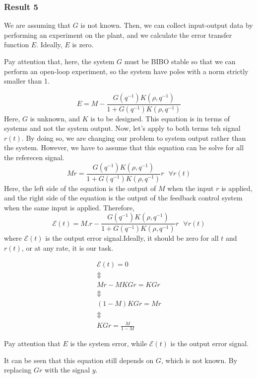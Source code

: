 \subsubsection{Result 5}
We are assuming that $G$ is not known. Then, we can collect input-output data by performing an experiment on the plant, and we calculate the error transfer function $E$. Ideally, $E$ is zero.

\begin{factbox}
Pay attention that, here, the system $G$ must be BIBO stable so that we can perform an open-loop experiment, so the system have poles with a norm strictly smaller than 1. 
\end{factbox}

\[
E = M - \frac{G(q^{-1}) K(\rho,q^{-1})}{1+G(q^{-1}) K(\rho,q^{-1})}
\]
Here, $G$ is unknown, and $K$ is to be designed. This equation is in terms of systems and not the system output. Now, let's apply to both terms teh signal $r(t)$. By doing so, we are changing our problem to system output rather than the system. However, we have to assume that this equation can be solve for all the referecen signal.
\[
Mr =  \frac{G(q^{-1}) K(\rho,q^{-1})}{1+G(q^{-1}) K(\rho,q^{-1})}r \:\:\: \forall r(t)
\]
Here, the left side of the equation is the output of $M$ when the input $r$ is applied, and the right side of the equation is the output of the feedback control system when the same input is applied. Therefore,
\[
\mathcal{E}(t) = M.r - \frac{G(q^{-1}) K(\rho,q^{-1})}{1+G(q^{-1}) K(\rho,q^{-1})}r \:\:\: \forall r(t)
\]
where $\mathcal{E}(t)$ is the output error signal.Ideally, it should be zero for all $t$ and $r(t)$, or at any rate, it is our task.

\[
\begin{array}{c}
\mathcal{E}(t) = 0 \\
\Updownarrow \\
Mr - MKGr = KGr \\
\Updownarrow \\
(1-M)KGr = Mr\\
\Updownarrow \\
KGr = \frac{M}{1-M}
\end{array}
\]
\begin{factbox}
Pay attention that $E$ is the system error, while $\mathcal{E}(t)$ is the output error signal.
\end{factbox}

It can be seen that this equation still depends on $G$, which is not known. By replacing $Gr$ with the signal $y$.\\

